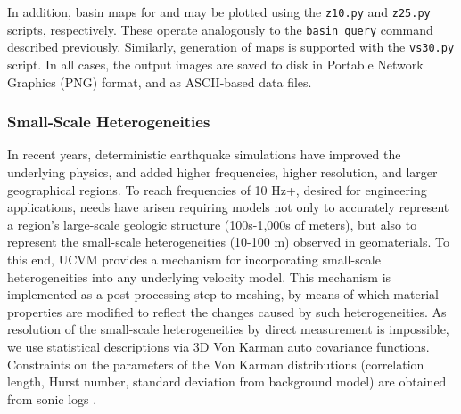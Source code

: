 In addition, basin maps for  and  may be plotted using the \texttt{z10.py} and \texttt{z25.py} scripts, respectively. These operate analogously to the \texttt{basin\_query} command described previously. Similarly, generation of \vsthirty{} maps is supported with the \texttt{vs30.py} script. In all cases, the output images are saved to disk in Portable Network Graphics (PNG) format, and as ASCII-based data files.

\subsubsection{Small-Scale Heterogeneities}
\label{sec:ssh}

In recent years, deterministic earthquake simulations have improved the underlying physics, and added higher frequencies, higher resolution, and larger geographical regions. To reach frequencies of 10 Hz+, desired for engineering applications, needs have arisen requiring models not only to accurately represent a region's large-scale geologic structure (100s-1,000s of meters), but also to represent the small-scale heterogeneities (10-100 m) observed in geomaterials. To this end, UCVM provides a mechanism for incorporating small-scale heterogeneities into any underlying velocity model. This mechanism is implemented as a post-processing step to meshing, by means of which material properties are modified to reflect the changes caused by such heterogeneities. As resolution of the small-scale heterogeneities by direct measurement is impossible, we use statistical descriptions via 3D Von Karman auto covariance functions. Constraints on the parameters of the Von Karman distributions (correlation length, Hurst number, standard deviation from background model) are obtained from sonic logs \citep[see][]{Olsen_2014_USGS}.

